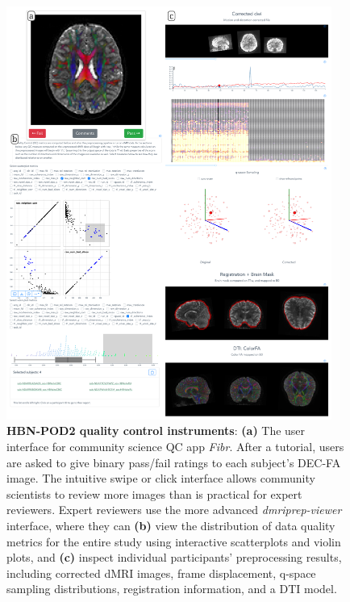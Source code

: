 \documentclass[fleqn,10pt,inline]{wlscirep}
\begin{document}
\begin{figure}[tbp]
    \includegraphics[width=0.95\textwidth]{hbn-pod2-qc-instruments.pdf}
    \caption{
        {\bf HBN-POD2 quality control instruments}:
        {\bf (a)} The user interface for community science QC app \emph{Fibr}. After a
        tutorial, users are asked to give binary pass/fail ratings to
        each subject's DEC-FA image. The
        intuitive swipe or click interface allows community scientists to
        review more images than is practical for expert reviewers. Expert
        reviewers use the more advanced \emph{dmriprep-viewer} interface, where
        they can
        {\bf (b)} view the distribution of data quality metrics for the entire
        study using interactive scatterplots and violin plots, and
        {\bf (c)} inspect individual participants' preprocessing results,
        including corrected dMRI images, frame displacement, q-space
        sampling distributions, registration information, and a DTI
        model.
        \label{fig:web-apps}
    }
\end{figure}
\end{document}
